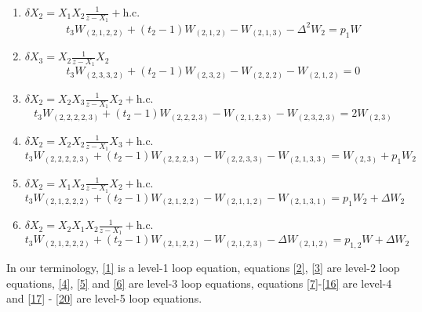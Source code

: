 \begin{enumerate}
          \begin{equation}
              \label{14}
              t_3 \Delta^2 W_{(2,1,2)} +(t_2-1)\Delta W_{(2,1,2)} - W_{(2,1,2,2)} - W_{(2,1,2,3)} = p_1 W_2 + W W_{(2,1,2)}
          \end{equation}
    \item $\delta X_2 = X_1 X_2 \frac{1}{z-X_1} + \text{h.c.}$
          \begin{equation}
              \label{15}
              t_3 W_{(2,1,2,2)} + (t_2-1)W_{(2,1,2)} - W_{(2,1,3)} - \Delta^2 W_2 = p_1 W
          \end{equation}
    \item $\delta X_3 = X_2 \frac{1}{z-X_1} X_2$
          \begin{equation}
              \label{16}
              t_3 W_{(2,3,3,2)} + (t_2-1)W_{(2,3,2)} - W_{(2,2,2)} - W_{(2,1,2)} = 0
          \end{equation}
    \item $\delta X_2 = X_2 X_3 \frac{1}{z-X_1} X_2 + \text{h.c.}$
          \begin{equation}
              \label{17}
              t_3 W_{(2,2,2,2,3)} + (t_2 - 1)W_{(2,2,2,3)} - W_{(2,1,2,3)} - W_{(2,3,2,3)} = 2 W_{(2,3)}
          \end{equation}
    \item $ \delta X_2 = X_2 X_2 \frac{1}{z-X_1} X_3 +\text{h.c.}$
          \begin{equation}
              \label{18}
              t_3 W_{(2,2,2,2,3)} + (t_2-1) W_{(2,2,2,3)} - W_{(2,2,3,3)} - W_{(2,1,3,3)} = W_{(2,3)} + p_1 W_2
          \end{equation}
    \item $\delta X_2 = X_1 X_2 \frac{1}{z-X_1} X_2 + \text{h.c.}$
          \begin{equation}
              \label{19}
              t_3 W_{(2,1,2,2,2)} + (t_2-1)W_{(2,1,2,2)} - W_{(2,1,1,2)} - W_{(2,1,3,1)} = p_1 W_2 + \Delta W_2
          \end{equation}
    \item $\delta X_2 = X_2 X_1 X_2 \frac{1}{z-X_1} + \text{h.c.}$
          \begin{equation}
              \label{20}
              t_3 W_{(2,1,2,2,2)} + (t_2 -1) W_{(2,1,2,2)} - W_{(2,1,2,3)} - \Delta W_{(2,1,2)} = p_{1,2} W + \Delta W_{2}
          \end{equation}
\end{enumerate}
%
In our terminology, \eqref{1} is a level-1 loop equation, equations \eqref{2}, \eqref{3} are
level-2 loop equations, \eqref{4}, \eqref{5} and \eqref{6} are level-3 loop equations, equations
\eqref{7}-\eqref{16} are level-4 and \eqref{17} - \eqref{20} are level-5 loop equations.

